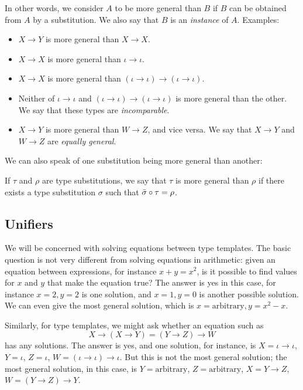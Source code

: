 \documentclass{article}
\begin{document}
In other words, we consider $A$ to be more general than $B$ if $B$ can
be obtained from $A$ by a substitution. We also say that $B$ is an
{\em instance} of $A$. Examples:

\begin{itemize}
\item $X\to Y$ is more general than $X\to X$.
\item $X\to X$ is more general than $\iota\to\iota$. 
\item $X\to X$ is more general than $(\iota\to\iota)\to(\iota\to\iota)$.
\item Neither of $\iota\to\iota$ and
  $(\iota\to\iota)\to(\iota\to\iota)$ is more general than the
  other. We say that these types are {\em incomparable}.
\item $X\to Y$ is more general than $W\to Z$, and vice versa. We say
  that $X\to Y$ and $W\to Z$ are {\em equally general}.
\end{itemize}

We can also speak of one substitution being more general than another:
\begin{definition}
  If $\tau$ and $\rho$ are type substitutions, we say that $\tau$
  is more general than $\rho$ if there exists a type substitution
  $\sigma$ such that $\bar{\sigma}\circ\tau=\rho$. 
\end{definition}

\subsection{Unifiers}

We will be concerned with solving equations between type templates. 
The basic question is not very different from solving equations in
arithmetic: given an equation between expressions, for instance
$x+y=x^2$, is it possible to find values for $x$ and $y$ that make
the equation true? The answer is yes in this case, for instance
$x=2,y=2$ is one solution, and $x=1,y=0$ is another possible
solution. We can even give the most general solution, which is
$x=\mbox{arbitrary}, y=x^2-x$. 

Similarly, for type templates, we might ask whether an equation such
as 
\[ X\to(X\to Y)=(Y\to Z)\to W
\]
has any solutions. The answer is yes, and one solution, for instance,
is $X=\iota\to\iota$, $Y=\iota$, $Z=\iota$,
$W=(\iota\to\iota)\to\iota$. But this is not the most general
solution; the most general solution, in this case, is
$Y=\mbox{arbitrary}$, $Z=\mbox{arbitrary}$, $X=Y\to Z$, $W=(Y\to Z)\to
Y$.
\end{document}
